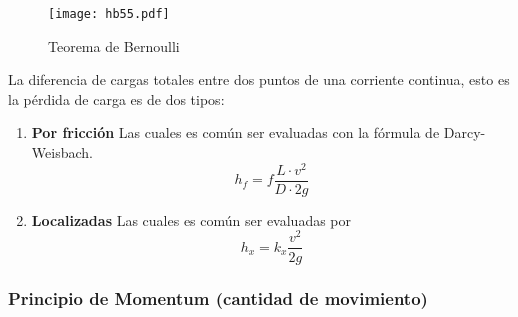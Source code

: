 \begin{figure}[h!]
\centering
  \texttt{[image: hb55.pdf]}
  \caption{Teorema de Bernoulli}
  \label{hb55}
\end{figure}

La diferencia de cargas totales entre dos puntos de una corriente continua, esto es la pérdida de carga es de dos tipos:

\begin{enumerate}
    \item \textbf{Por fricción} Las cuales es común ser evaluadas con la fórmula de Darcy- Weisbach.
    \begin{equation}
        h_f = f \frac{L\cdot v^2}{D\cdot 2g}
    \end{equation}
    \item \textbf{Localizadas} Las cuales es común ser evaluadas por 
    \begin{equation}
        h_x = k_x \frac{v^2}{2g}
    \end{equation}
\end{enumerate}

\subsubsection{Principio de Momentum (cantidad de movimiento)}

